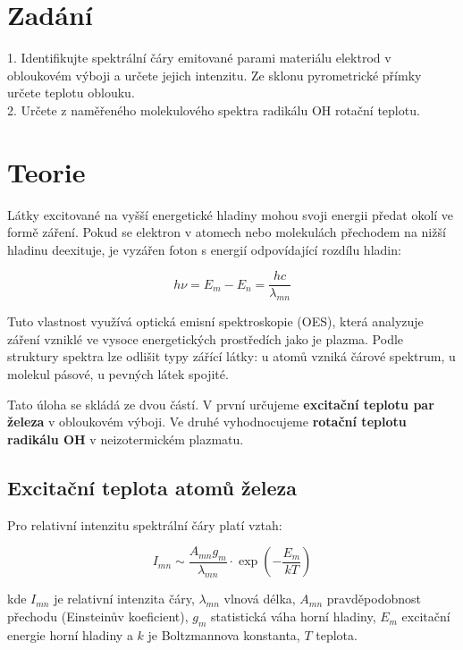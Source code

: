 \documentclass[czech,11pt,a4paper]{article}
\begin{document}
	\begin{multicols}{2}
		\section{Zadání}
		1. Identifikujte spektrální čáry emitované parami materiálu elektrod v obloukovém výboji a určete jejich intenzitu. Ze sklonu pyrometrické přímky určete teplotu oblouku. \\
		2. Určete z naměřeného molekulového spektra radikálu OH rotační teplotu.
		
		
		\section{Teorie}
		
		
		
		Látky excitované na vyšší energetické hladiny mohou svoji energii předat okolí ve formě záření. Pokud se elektron v atomech nebo molekulách přechodem na nižší hladinu deexituje, je vyzářen foton s energií odpovídající rozdílu hladin:
		
		
		\begin{equation}
			h \nu = E_m - E_n = \frac{hc}{\lambda_{mn}}
		\end{equation}
		
		
		Tuto vlastnost využívá optická emisní spektroskopie (OES), která analyzuje záření vzniklé ve vysoce energetických prostředích jako je plazma. Podle struktury spektra lze odlišit typy zářící látky: u atomů vzniká čárové spektrum, u molekul pásové, u pevných látek spojité.
		
		Tato úloha se skládá ze dvou částí. V první určujeme \textbf{excitační teplotu par železa} v obloukovém výboji. Ve druhé vyhodnocujeme \textbf{rotační teplotu radikálu OH} v neizotermickém plazmatu.
		
		\subsection{Excitační teplota atomů železa}
		
		Pro relativní intenzitu spektrální čáry platí vztah:
		
		\begin{equation}			
			I_{mn} \sim \frac{A_{mn} g_m}{\lambda_{mn}} \cdot \exp\left(-\frac{E_m}{kT}\right)		
		\end{equation}
		
		kde $I_{mn}$ je relativní intenzita čáry, $\lambda_{mn}$ vlnová délka, $A_{mn}$ pravděpodobnost přechodu (Einsteinův koeficient), $g_m$ statistická váha horní hladiny, $E_m$ excitační energie horní hladiny a $k$ je Boltzmannova konstanta, $T$ teplota.
		

\end{multicols}
\end{document}
